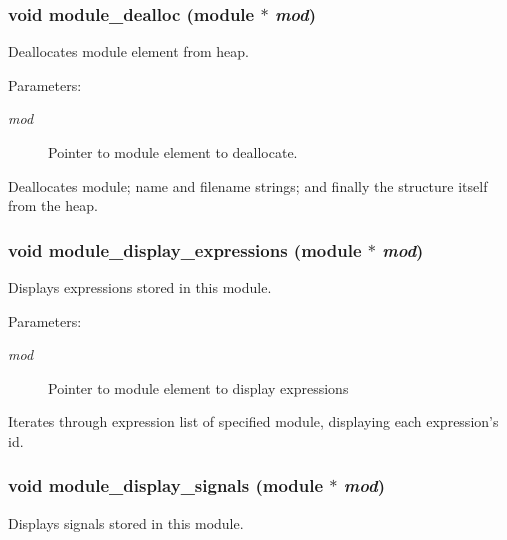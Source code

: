 \subsubsection{\setlength{\rightskip}{0pt plus 5cm}void module\_\-dealloc ({\bf module} $\ast$ {\em mod})}\label{module_8h_a8}


Deallocates module element from heap.

\begin{Desc}
\item[Parameters: ]\par
\begin{description}
\item[{\em 
mod}]Pointer to module element to deallocate.\end{description}
\end{Desc}
Deallocates module; name and filename strings; and finally the structure itself from the heap. 
\subsubsection{\setlength{\rightskip}{0pt plus 5cm}void module\_\-display\_\-expressions ({\bf module} $\ast$ {\em mod})}\label{module_8h_a6}


Displays expressions stored in this module.

\begin{Desc}
\item[Parameters: ]\par
\begin{description}
\item[{\em 
mod}]Pointer to module element to display expressions\end{description}
\end{Desc}
Iterates through expression list of specified module, displaying each expression's id. 
\subsubsection{\setlength{\rightskip}{0pt plus 5cm}void module\_\-display\_\-signals ({\bf module} $\ast$ {\em mod})}\label{module_8h_a5}


Displays signals stored in this module.

